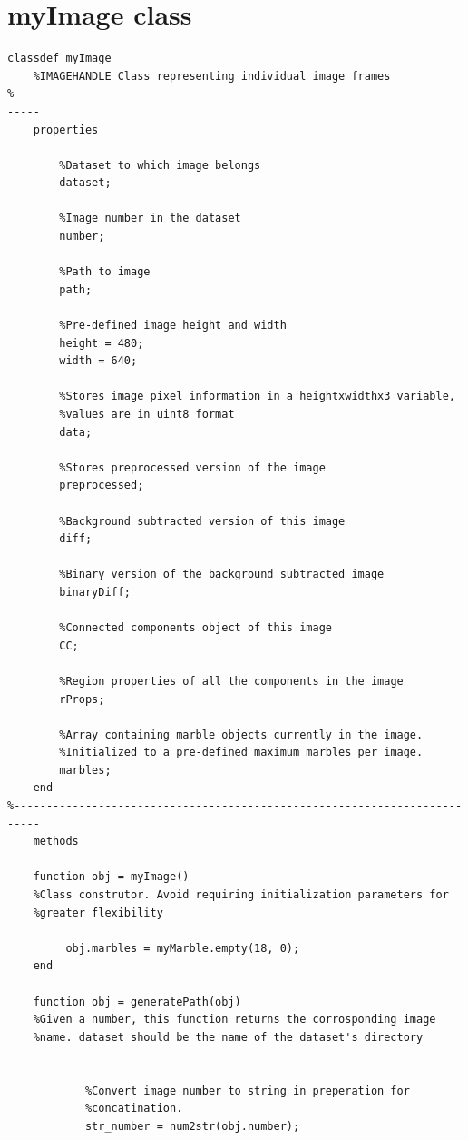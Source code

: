 \documentclass[10pt,a4paper,onecolumn]{report}
\begin{document}
\section{myImage class}
\begin{lstlisting}
classdef myImage
    %IMAGEHANDLE Class representing individual image frames
%--------------------------------------------------------------------------
    properties
        
        %Dataset to which image belongs
        dataset;
        
        %Image number in the dataset
        number;
        
        %Path to image
        path;
        
        %Pre-defined image height and width
        height = 480;
        width = 640;
        
        %Stores image pixel information in a heightxwidthx3 variable,
        %values are in uint8 format
        data;
        
        %Stores preprocessed version of the image
        preprocessed;
        
        %Background subtracted version of this image
        diff;
        
        %Binary version of the background subtracted image
        binaryDiff;
        
        %Connected components object of this image
        CC;
        
        %Region properties of all the components in the image
        rProps;
        
        %Array containing marble objects currently in the image.
        %Initialized to a pre-defined maximum marbles per image.
        marbles;
    end 
%--------------------------------------------------------------------------    
    methods
        
    function obj = myImage()
    %Class construtor. Avoid requiring initialization parameters for
    %greater flexibility

         obj.marbles = myMarble.empty(18, 0);
    end

    function obj = generatePath(obj)
    %Given a number, this function returns the corrosponding image
    %name. dataset should be the name of the dataset's directory


            %Convert image number to string in preperation for
            %concatination.
            str_number = num2str(obj.number);


\end{lstlisting}
\end{document}
